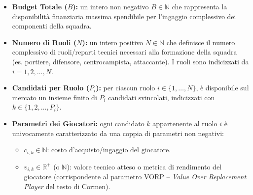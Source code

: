 \documentclass{cisXXX} %
\begin{document}
    \begin{itemize}                                                                                                                           
        \item \textbf{Budget Totale ($B$):} un intero non negativo $B \in \mathbb{N}$ che rappresenta la disponibilità finanziaria massima    
  spendibile per l'ingaggio complessivo dei componenti della squadra.                                                                         
        \item \textbf{Numero di Ruoli ($N$):} un intero positivo $N \in \mathbb{N}$ che definisce il numero complessivo di ruoli/reparti      
  tecnici necessari alla formazione della squadra (es. portiere, difensore, centrocampista, attaccante). I ruoli sono indicizzati da $i = 1, 2,
  \dots, N$.                                                                                                                                  
        \item \textbf{Candidati per Ruolo ($P_i$):} per ciascun ruolo $i \in \{1, \dots, N\}$, è disponibile sul mercato un insieme finito di 
  $P_i$ candidati svincolati, indicizzati con $k \in \{1, 2, \dots, P_i\}$.                                                                   
        \item \textbf{Parametri dei Giocatori:} ogni candidato $k$ appartenente al ruolo $i$ è univocamente caratterizzato da una coppia di   
  parametri non negativi:                                                                                                                     
        \begin{itemize}                                                                                                                       
            \item $c_{i,k} \in \mathbb{N}$: costo d'acquisto/ingaggio del giocatore.                                                          
            \item $v_{i,k} \in \mathbb{R}^+$ (o $\mathbb{N}$): valore tecnico atteso o metrica di rendimento del giocatore (corrispondente al 
  parametro VORP -- \textit{Value Over Replacement Player} del testo di Cormen).                                                              
        \end{itemize}                                                                                                                         
    \end{itemize}                                                                                                                             
                                                                                                                                              
\end{document}
